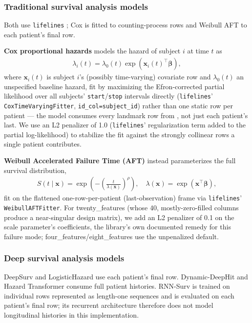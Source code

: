 \documentclass[10pt,letterpaper]{article}
\begin{document}
\subsubsection*{Traditional survival analysis models}
Both use \texttt{lifelines} \cite{davidson2019lifelines}; Cox is fitted to counting-process rows and Weibull AFT to each patient's final row.

\textbf{Cox proportional hazards} \cite{cox1972regression} models the hazard of subject $i$ at time $t$ as
\begin{align}
\lambda_i(t) = \lambda_0(t)\exp(\boldsymbol{x}_i(t)^\intercal\boldsymbol{\beta}),
\end{align}
where $\boldsymbol{x}_i(t)$ is subject $i$'s (possibly time-varying) covariate row and $\lambda_0(t)$ an unspecified baseline hazard, fit by maximizing the Efron-corrected partial likelihood over all subjects' \texttt{start}/\texttt{stop} intervals directly (\texttt{lifelines}' \texttt{CoxTimeVaryingFitter}, \texttt{id\_col=subject\_id}) rather than one static row per patient — the model consumes every landmark row from , not just each patient's last. We use an L2 penalizer of 1.0 (\texttt{lifelines}' regularization term added to the partial log-likelihood) to stabilize the fit against the strongly collinear rows a single patient contributes.

\textbf{Weibull Accelerated Failure Time (AFT)} \cite{anderson1991nonproportional_weibull} instead parameterizes the full survival distribution,
\begin{align}
S(t\mid\boldsymbol{x}) = \exp\!\left(-\left(\frac{t}{\lambda(\boldsymbol{x})}\right)^{\rho}\right), \quad \lambda(\boldsymbol{x}) = \exp(\boldsymbol{x}^\intercal\boldsymbol{\beta}),
\end{align}
fit on the flattened one-row-per-patient (last-observation) frame via \texttt{lifelines}' \texttt{WeibullAFTFitter}. For twenty\_features (whose 40, mostly-zero-filled columns produce a near-singular design matrix), we add an L2 penalizer of 0.1 on the scale parameter's coefficients, the library's own documented remedy for this failure mode; four\_features/eight\_features use the unpenalized default.

\subsubsection*{Deep survival analysis models}
DeepSurv and LogisticHazard use each patient's final row. Dynamic-DeepHit and Hazard Transformer consume full patient histories. RNN-Surv is trained on individual rows represented as length-one sequences and is evaluated on each patient's final row; its recurrent architecture therefore does not model longitudinal histories in this implementation.
\end{document}
